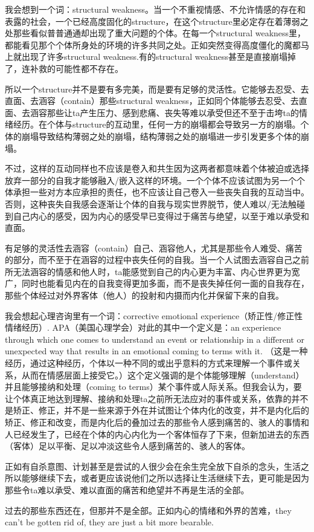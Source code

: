 我会想到一个词：structural weakness。当一个不重视情感、不允许情感的存在和表露的社会，一个已经高度固化的structure，在这个structure里必定存在着薄弱之处\pozhehao{}那些看似普普通通却出现了重大问题的个体。在每一个structural weakness里，都能看见那个个体所身处的环境的许多共同之处。正如突然变得高度僵化的魔都马上就出现了许多structural weakness.有的structural weakness甚至是直接崩塌掉了，连补救的可能性都不存在。

所以一个structure并不是要有多完美，而是要有足够的灵活性。它能够去忍受、去直面、去涵容（contain）那些structural weakness，正如同个体能够去忍受、去直面、去涵容那些让ta产生压力、感到悲痛、丧失等难以承受但还不至于击垮ta的情绪经历。在个体与structure的互动里，任何一方的崩塌都会导致另一方的崩塌。个体的崩塌导致结构薄弱之处的崩塌，结构薄弱之处的崩塌进一步引发更多个体的崩塌。

不过，这样的互动同样也不应该是卷入和共生\pozhehao{}因为这两者都意味着个体被迫或选择放弃一部分的自我才能够融入/嵌入这样的环境。一个个体不应该试图为另一个个体承担一些对方本应承担的责任，也不应该让自己卷入一些丧失自我的互动当中。否则，这种丧失自我感会逐渐让个体的自我与现实世界脱节，使人难以/无法触碰到自己内心的感受，因为内心的感受早已变得过于痛苦与绝望，以至于难以承受和直面。

有足够的灵活性去涵容（contain）自己、涵容他人，尤其是那些令人难受、痛苦的部分，而不至于在涵容的过程中丧失任何的自我。当一个人试图去涵容自己之前所无法涵容的情感和他人时，ta能感觉到自己的内心更为丰富、内心世界更为宽广，同时也能看见内在的自我变得更加多面，而不是丧失掉任何一面的自我存在，那些个体经过对外界客体（他人）的投射和内摄而内化并保留下来的自我。

我会想起心理咨询里有一个词：corrective emotional experience（矫正性/修正性情绪经历）. APA（美国心理学会）对此的其中一个定义是：an experience through which one comes to understand an event or relationship in a different or unexpected way that results in an emotional coming to terms with it. （这是一种经历，通过这种经历，个体以一种不同的或出乎意料的方式来理解一个事件或关系，从而在情感层面上接受它。）这个定义强调的是个体能够理解（understand）并且能够接纳和处理（coming to terms）某个事件或人际关系。但我会认为，要让个体真正地达到理解、接纳和处理ta之前所无法应对的事件或关系，依靠的并不是矫正、修正，并不是一些来源于外在并试图让个体内化的改变，并不是内化后的矫正、修正和改变，而是内化后的叠加\pozhehao{}过去的那些令人感到痛苦的、骇人的事情和人已经发生了，已经在个体的内心内化为一个客体恒存了下来，但新加进去的东西（客体）足以平衡、足以冲淡这些令人感到痛苦的、骇人的客体。

正如有自杀意图、计划甚至是尝试的人很少会在余生完全放下自杀的念头，生活之所以能够继续下去，或者更应该说他们之所以选择让生活继续下去，更可能是因为那些令ta难以承受、难以直面的痛苦和绝望并不再是生活的全部。

过去的那些东西还在，但那并不是全部。正如内心的情绪和外界的苦难，they can't be gotten rid of, they are just a bit more bearable.
